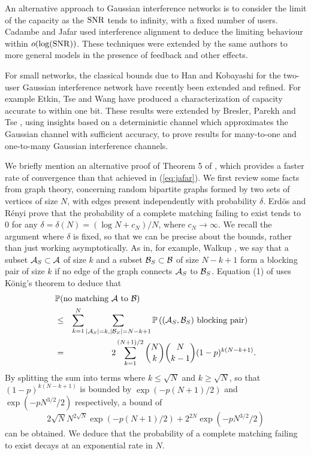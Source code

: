 \documentclass[journal]{IEEEtran}
\begin{document}
An alternative approach to Gaussian interference networks is to consider the limit of the capacity
as the ${\rm{SNR}}$
tends to infinity, with a fixed number of users. Cadambe and Jafar \cite{cadambe} 
used interference alignment to deduce the limiting behaviour within
$o(\log({\rm{SNR}}))$.  These techniques were extended by the same authors \cite{cadambe2}
to more general models  in the presence of feedback and other effects.

For small networks, the classical bounds due to Han and Kobayashi \cite{han2}
for the two-user Gaussian interference network
have recently been extended and refined. For example Etkin, Tse and Wang
\cite{etkin} have produced a characterization of capacity accurate to within one
bit. These results were extended by Bresler, Parekh and Tse \cite{bresler},
using insights based on a deterministic channel which approximates the Gaussian
channel with sufficient accuracy, to prove results for many-to-one and one-to-many
Gaussian interference channels.

We briefly mention an alternative proof of Theorem 5 of \cite{jafar}, which provides
a faster rate of convergence than that achieved in (\ref{eq:jafar}). 
We first review some facts from graph theory, concerning
random bipartite graphs formed by
two sets of vertices of size $N$, with edges present independently with probability
$\delta$. Erd\"{o}s and R\'{e}nyi \cite{erdos} prove that
the probability of a complete matching 
failing to exist tends to $0$ for any $\delta = \delta(N) = (\log N + c_N)/N$,
where $c_N \rightarrow \infty$. 
We recall  the argument where $\delta$ is fixed, so that we
can be precise about the bounds, rather than just working asymptotically.
As in, for example, Walkup \cite{walkup2}, we say that a subset ${\mathcal{A}}_S \subset 
{\mathcal{A}}$ of
size $k$ and a subset ${\mathcal{B}}_S \subset {\mathcal{B}}$ of size $N-k+1$ form a blocking pair of 
size $k$ if no
edge of the graph connects ${\mathcal{A}}_S$ to ${\mathcal{B}}_S$. Equation (1) of \cite{walkup2} uses
K\"{o}nig's theorem to deduce
that 
\begin{eqnarray} 
\lefteqn{\pr( \mbox{no matching $\AAA$ to $\BBB$} ) } \nonumber \\
 & \leq &
\sum_{k=1}^N \sum_{|\AAA_S| = k, |\BBB_S| = N-k+1}  \pr \left( (\AAA_S, \BBB_S) 
\mbox{ blocking pair} \right) \mbox{\;\;\;} \label{eq:walkup} \\
& = & 2 \sum_{k=1}^{(N+1)/2} \binom{N}{k} \binom{N}{k-1} (1-p)^{k(N-k+1)}. \nonumber
\end{eqnarray}
By splitting the sum into terms where $k \leq \sqrt{N}$ and $k \geq \sqrt{N}$, 
so that $(1-p)^{k(N-k+1)}$ is bounded by $\exp(-p (N+1)/2)$ and $\exp(-p N^{3/2}/2)$
respectively, a bound of
$$ 2 \sqrt{N} N^{2 \sqrt{N}} \exp(-p(N+1)/2) + 2^{2N} \exp(-p N^{3/2}/2)$$ 
can be obtained.
We deduce that the probability
of a complete matching failing to exist decays at an exponential rate in $N$.
\end{document}
